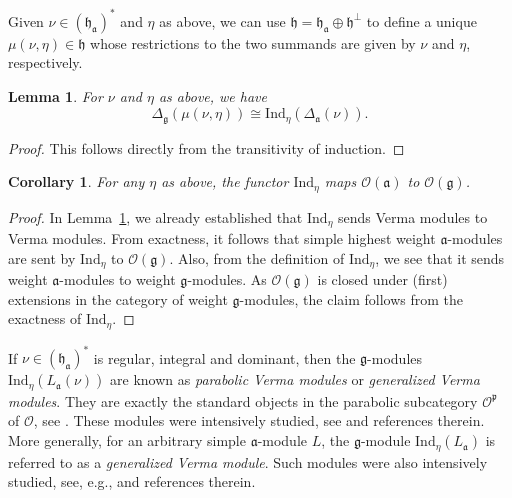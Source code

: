 \documentclass[a4paper]{amsart}
\newtheorem{lemma}[theorem]{Lemma}
\newtheorem{corollary}[theorem]{Corollary}
\begin{document}
Given $\nu\in(\mathfrak{h}_\mathfrak{a})^*$ and $\eta$ as above,
we can use $\mathfrak{h}=\mathfrak{h}_\mathfrak{a}\oplus\mathfrak{h}^{\perp}$
to define a unique $\mu(\nu,\eta)\in \mathfrak{h}$ whose restrictions to the 
two summands are given by $\nu$ and $\eta$, respectively.

\begin{lemma}\label{lem-s2.2-2}
For $\nu$ and $\eta$ as above, we have
\begin{displaymath}
\Delta_{\mathfrak{g}}(\mu(\nu,\eta)) \cong 
\mathrm{Ind}_{\eta}(\Delta_{\mathfrak{a}}(\nu)).
\end{displaymath}
\end{lemma}

\begin{proof}
This follows directly from the transitivity of induction. 
\end{proof}

\begin{corollary}\label{cor-s2.2-3}
For any $\eta$ as above, the functor
$\mathrm{Ind}_{\eta}$ maps $\mathcal{O}(\mathfrak{a})$
to $\mathcal{O}(\mathfrak{g})$.
\end{corollary}

\begin{proof}
In Lemma~\ref{lem-s2.2-2}, we already established that 
$\mathrm{Ind}_{\eta}$ sends Verma modules to Verma modules.
From exactness, it follows that simple highest weight 
$\mathfrak{a}$-modules are sent by $\mathrm{Ind}_{\eta}$
to $\mathcal{O}(\mathfrak{g})$. Also, from the definition of
$\mathrm{Ind}_{\eta}$, we see that it sends 
weight $\mathfrak{a}$-modules to weight 
$\mathfrak{g}$-modules. As $\mathcal{O}(\mathfrak{g})$ 
is closed under (first) extensions in the category of 
weight $\mathfrak{g}$-modules, the claim follows
from the exactness of $\mathrm{Ind}_{\eta}$.
\end{proof}

If $\nu\in(\mathfrak{h}_\mathfrak{a})^*$ is regular, integral
and dominant,
then the $\mathfrak{g}$-modules
$\mathrm{Ind}_\eta(L_\mathfrak{a}(\nu))$
are known as {\em parabolic Verma modules}
or {\em generalized Verma modules}. They are exactly the 
standard objects in the parabolic subcategory $\mathcal{O}^\mathfrak{p}$
of $\mathcal{O}$, see \cite{RC}. These modules were intensively studied,
see \cite{Le77,Bo85,CC87,CIS,Mat} and references therein.
More generally, for an arbitrary simple
$\mathfrak{a}$-module $L$, the $\mathfrak{g}$-module 
$\mathrm{Ind}_\eta(L_\mathfrak{a})$ is referred to as a 
{\em generalized Verma module}. Such modules were also intensively studied,
see, e.g., \cite{Fu,Ma95,Ma98,MO,KhM99,Ma00,BFL,MS} and references therein.
\end{document}
